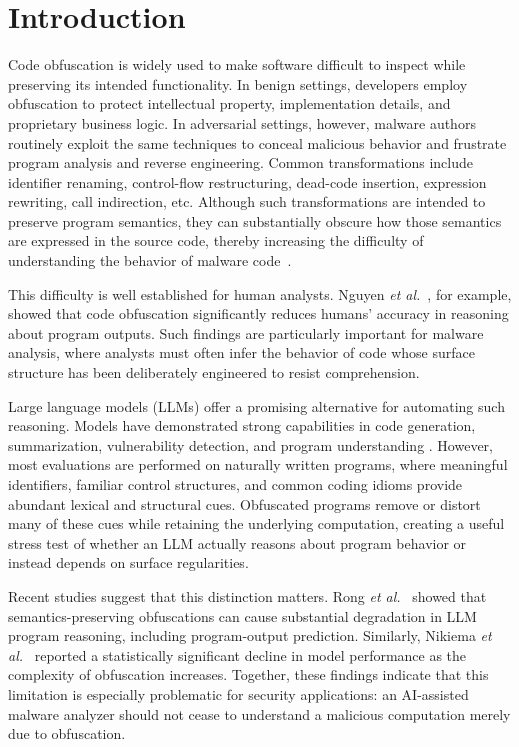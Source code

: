 \section{Introduction}

Code obfuscation is widely used to make software difficult to inspect
while preserving its intended functionality. In benign settings,
developers employ obfuscation to protect intellectual property,
implementation details, and proprietary business logic. In adversarial
settings, however, malware authors routinely exploit the same
techniques to conceal malicious behavior and frustrate program
analysis and reverse engineering. Common transformations include
identifier renaming, control-flow restructuring, dead-code insertion,
expression rewriting, call indirection, etc. Although such
transformations are intended to preserve program semantics, they can
substantially obscure how those semantics are expressed in the source
code, thereby increasing the difficulty of understanding the
behavior of malware code~\cite{collberg1997taxonomy,collberg2002manufacturing,
Obfuscation-The-Hidden-Malware,
An-Observational-Investigation-of-Reverse-Engineers-Process-and-Mental-Models}.

This difficulty is well established for human analysts. Nguyen
{\em et al.}~\cite{nguyen2026effectcodeobfuscationhuman}, for example,
showed that code obfuscation significantly reduces humans' accuracy in
reasoning about program outputs. Such findings are particularly
important for malware analysis, where analysts must often infer the
behavior of code whose surface structure has been deliberately
engineered to resist comprehension.

Large language models (LLMs) offer a promising alternative for
automating such reasoning. Models have demonstrated strong
capabilities in code generation, summarization, vulnerability
detection, and program understanding
\cite{chen2021evaluatinglargelanguagemodels,li2022codebert,
guo2021graphcodebert,roziere2023codegen,
Competition-level-code-generation-with-AlphaCode}.
However, most evaluations are performed on naturally written programs,
where meaningful identifiers, familiar control structures, and common
coding idioms provide abundant lexical and structural cues. Obfuscated
programs remove or distort many of these cues while retaining the
underlying computation, creating a useful stress test of whether an
LLM actually reasons about program behavior or instead depends on
surface regularities.

Recent studies suggest that this distinction matters.
Rong {\em et al.}~\cite{ase26} showed that semantics-preserving
obfuscations can cause substantial degradation in LLM program
reasoning, including program-output prediction. Similarly, Nikiema
{\em et al.}~\cite{nikiema2025codebarrierllmsactually} reported a
statistically significant decline in model performance as the
complexity of obfuscation increases. Together, these findings indicate
that this limitation is especially problematic
for security applications: an AI-assisted malware analyzer should not
cease to understand a malicious computation merely due to obfuscation.

